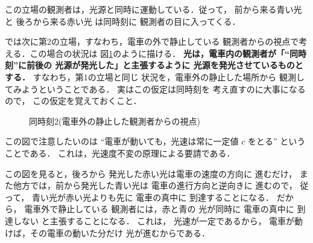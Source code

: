 この立場の観測者は，光源と同時に運動している．従って，
前から来る青い光 と 後ろから来る赤い光 は同時刻に
観測者の目に入ってくる．

では次に第2の立場，すなわち，電車の外で静止している
観測者からの視点で考える．この場合の状況は
図\ref{fig:doujikoku2}のように描ける．
\textbf{
光は，電車内の観測者が「“同時刻”に前後の
光源が発光した」と主張するように
光源を発光させているものとする．}
すなわち，第1の立場と同じ
状況を，電車外の静止した場所から
観測してみようということである．
実はこの仮定は同時刻を
考え直すのに大事になるので，
この仮定を覚えておくこと．
                \begin{figure}[hbt]
                    \begin{center}
                        \caption{同時刻2(電車外の静止した観測者からの視点)}
                        \label{fig:doujikoku2}
                    \end{center}
                \end{figure}

この図で注意したいのは
“電車が動いても，光速は常に一定値 $c$ をとる”
ということである．
これは，光速度不変の原理による要請である．

この図を見ると，後ろから
発光した赤い光は電車の速度の方向に
進むだけ，
また他方では，前から発光した青い光は
電車の進行方向と逆向きに
進むので，
従って，
青い光が赤い光よりも先に
電車の真中に
到達することになる．
だから，
電車外で静止している
観測者には，赤と青の
光が同時に
電車の真中に
到達しない
と主張することになる．
これは，
光速が一定であるから，
電車が動けば，その電車の動いた分だけ
光が進むからである．


